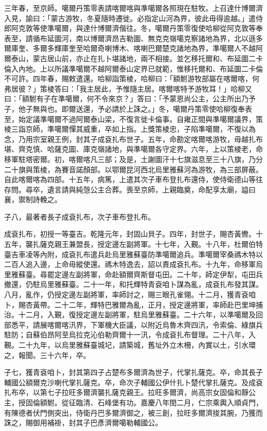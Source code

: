 \begin{pinyinscope}
三年春，至京師。噶爾丹策零表請喀爾喀與準噶爾各照現在駐牧。上召達什博爾濟入見，諭曰：「蒙古游牧，冬夏隨時遷徙。必指定山河為界，彼此毋得逾越。」遣侍郎阿克敦等使準噶爾，與達什博爾濟偕往。冬，噶爾丹策零復使哈柳從阿克敦等奉表至，請循布延圖河，南以博爾濟昂吉勒圖、無克克嶺噶克察諸地為界，北以遜多爾庫奎、多爾多輝庫奎至哈爾奇喇博木、喀喇巴爾楚克諸地為界，準噶爾人不越阿爾泰山，蒙古居山前，亦止在扎卜堪諸地，兩不相接。並乞移托爾和、布延圖二卡倫入內地。上以所議準噶爾不越阿爾泰山定界已就範，惟移托爾和、布延圖二卡倫不可許。四年春，賜敕遣還。哈柳詣策棱，哈柳曰：「額駙游牧部屬在喀爾喀，何弗居彼？」策棱答曰：「我主居此，予惟隨主居。喀爾喀特予游牧耳！」哈柳又曰：「額駙有子在準噶爾，何不令來京？」答曰：「予蒙恩尚公主，公主所出乃予子，他子無與也。即爾送還，予必請於上誅之。」冬，噶爾丹策零使哈柳復奉表至，始定議準噶爾不過阿爾泰山梁，不復言徙卡倫事。自雍正間與準噶爾議界，策棱三詣京師，準噶爾憚其威重，卒如上指。上獎策棱忠，子陷準噶爾，不復以為念，乃用宗室親王例，封其子成袞扎布世子。五年，命勘定喀爾喀游牧，毋越扎布堪、齊克慎、哈薩克圖、庫克嶺諸地，與準噶爾各守定界。六年，上以策棱老，命移軍駐塔密爾。初，喀爾喀凡三部；及是，土謝圖汗十七旗滋息至三十八旗，乃分二十旗與策棱，為賽音諾顏部。以鄂爾昆河西北烏里雅蘇河為游牧，為三部屏蔽。自此喀爾喀為四部。十五年，病篤，上遣其次子車布登扎布還侍，使侍衛德山等往存問。尋卒，遺言請與純愨公主合葬。喪至京師，上親臨奠，命配享太廟，謚曰襄，禦制詩輓之。

子八，最著者長子成袞扎布，次子車布登扎布。

成袞扎布，初授一等臺吉。乾隆元年，封固山貝子。四年，封世子，賜杏黃轡。十五年，襲扎薩克親王兼盟長，授定邊左副將軍。十七年，入覲。十八年，杜爾伯特臺吉車凌等內附，成袞扎布遣兵赴烏里雅蘇臺防準噶爾追兵。準噶爾宰桑禡木特以二百人追入邊，上命毋縱使還。禡木特逸去，詔以責成袞扎布。十九年，命移軍烏里雅蘇臺。尋罷定邊左副將軍，命赴額爾齊斯督屯田。二十年，師定伊犁，屯田兵撤還，仍駐烏里雅蘇臺。二十一年，和托輝特青袞咱卜謀為亂，成袞扎布發其謀。八月，亂作，仍授定邊左副將軍，率師討之，賜三眼孔雀翎。十二月，獲青袞咱卜，賜杏黃帶。二十二年，輝特巴雅爾為亂，正月，授定邊將軍，率師赴巴里坤捕治。十二月，入覲，復授定邊左副將軍，駐烏里雅蘇臺。二十六年，以準噶爾及回部悉平，請展喀爾喀汛界，下軍機大臣議，以附近烏魯木齊四汛，令索倫、綠旗兵駐防；自蘇伯昂阿至烏拉克沁伯勒齊爾十一汛，令成袞扎布督理。二十八年，入覲。二十九年，以烏里雅蘇臺城圮，請築城，舊址外立木柵，內實以土，引水環之，報聞。三十六年，卒。

子七，獲青袞咱卜，封其第四子占楚布多爾濟為世子，代掌扎薩克。卒，命其長子輔國公額爾克沙喇代掌扎薩克。卒，命次子輔國公伊什扎卜楚代掌扎薩克。及成袞扎布卒，以第七子拉旺多爾濟襲扎薩克親王。拉旺多爾濟，尚高宗女固倫和靜公主，授固倫額駙。從征臨清、石峰堡有功。嘉慶八年閏二月，仁宗乘輿入順貞門，有陳德者伏門側突出，侍衛丹巴多爾濟御之，被三創，拉旺多爾濟捘其腕，乃獲而誅之，賜御用補褂，封其子巴彥濟爾噶勒輔國公。


\end{pinyinscope}
